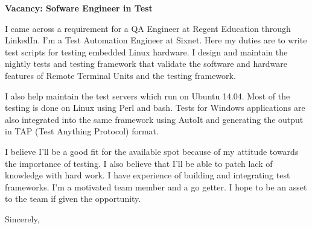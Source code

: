 \documentclass[12pt]{extletter}
\begin{document}
\begin{letter}{}

\opening{\textbf{Vacancy: Sofware Engineer in Test}}
 
I came across a requirement for a QA Engineer at Regent Education through
LinkedIn. I'm a Test Automation Engineer at Sixnet. Here my duties are to write
test scripts for testing embedded Linux hardware. I design and maintain the
nightly tests and testing framework that validate the software and hardware
features of Remote Terminal Units and the testing framework.

I also help maintain the test servers which run on Ubuntu 14.04. Most of the
testing is done on Linux using Perl and bash. Tests for Windows applications
are also integrated into the same framework using AutoIt and generating the
output in TAP (Test Anything Protocol) format.

I believe I'll be a good fit for the available spot because of my attitude
towards the importance of testing. I also believe that I'll be able to patch
lack of knowledge with hard work. I have experience of building and integrating
test frameworks. I'm a motivated team member and a go getter. I hope to be an
asset to the team if given the opportunity.

\vspace{2\parskip} %
\closing{Sincerely,}
\vspace{2\parskip} %

\end{letter}
 
\end{document}
